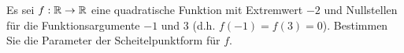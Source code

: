 \documentclass[12pt]{article}
\begin{document}
\begin{exercise}\label{ex:scheitelpunktform_von_nullstellen}
Es sei $f: \mathbb{R} \rightarrow \mathbb{R}$ eine quadratische Funktion mit Extremwert $-2$ und Nullstellen für die Funktionsargumente $-1$ und $3$ (d.h. $f(-1) = f(3) = 0$). Bestimmen Sie die Parameter der Scheitelpunktform für $f$.
\end{exercise}

%
%
\newpage
\end{document}
